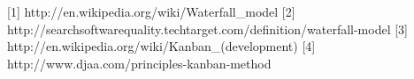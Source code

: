 [1] http://en.wikipedia.org/wiki/Waterfall_model
[2] http://searchsoftwarequality.techtarget.com/definition/waterfall-model
[3] http://en.wikipedia.org/wiki/Kanban_(development)
[4] http://www.djaa.com/principles-kanban-method 

